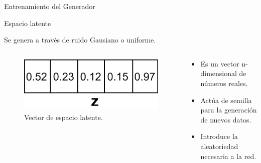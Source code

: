 \begin{frame}{Entrenamiento del Generador}
    
    {\Large \alert{Espacio latente}}
    
    Se genera a través de ruido Gausiano o uniforme.
    
    \begin{columns}[T]
    \begin{column}{.48\textwidth}
    
    \begin{figure}
        \centering
        \includegraphics[width=\textwidth]{Slides/figures/GAN/Latent Space.png}
        \caption{Vector de espacio latente.}
    \end{figure}
    
    \end{column}
    \hfill
    \begin{column}{.48\textwidth}
    
    \begin{itemize}
        \item Es un \alert{vector n-dimensional} de números reales.
        \item Actúa de \alert{semilla} para la generación de nuevos datos.
        \item Introduce la aleatoriedad necesaria a la red.
    \end{itemize}
    
    \end{column}
    \end{columns}
    
\end{frame}

